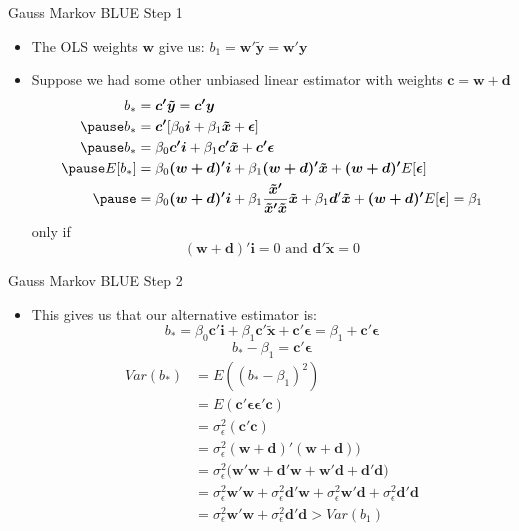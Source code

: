 \documentclass[aspectratio=169, handout]{beamer}
\numberwithin{equation}{section}
\begin{document}
\begin{frame}{Gauss Markov BLUE Step 1}
\begin{itemize}
\item The OLS weights $\bm{w}$ give us: $b_1=\bm{w'}\bm{\tilde{y}}=\bm{w'}\bm{y}$
\item Suppose we had some other unbiased linear estimator with weights $\bm{c}=\bm{w+d}$\pause
\begin{align*}
b_*&=\bm{c'}\bm{\tilde{y}}=\bm{c'}\bm{y}\\\pause
b_*&=\bm{c'}[\beta_0\bm{i}+\beta_1\bm{\tilde{x}}+\bm{\epsilon}]\\\pause
b_*&=\beta_0\bm{c'}\bm{i}+\beta_1\bm{c'}\bm{\tilde{x}}+\bm{c'\epsilon}\\\pause
E[b_*]&=\beta_0\bm{(w+d)'}\bm{i}+\beta_1\bm{(w+d)'}\bm{\tilde{x}}+\bm{(w+d)'}E[\bm{\epsilon}]\\\pause
&=\beta_0\bm{(w+d)'}\bm{i}+\beta_1\frac{\bm{\tilde{x}'}}{\bm{\tilde{x}'\tilde{x}}}\bm{\tilde{x}}+\beta_1\bm{d}'\bm{\tilde{x}}+\bm{(w+d)'}E[\bm{\epsilon}]=\beta_1
\end{align*}
only if 
$$\bm{(w+d)'}\bm{i}=0 \text{ and } \bm{d'}\bm{\tilde{x}}=0$$
\end{itemize}
\end{frame}

\begin{frame}{Gauss Markov BLUE Step 2}
\begin{itemize}
\item This gives us that our alternative estimator is:
$$b_*=\beta_0\bm{c'}\bm{i}+\beta_1\bm{c'}\bm{\tilde{x}}+\bm{c'\epsilon}=\beta_1+\bm{c'\epsilon}$$
$$b_*-\beta_1=\bm{c'\epsilon}$$
\begin{align*}
Var(b_*)&=E((b_*-\beta_1)^2)\\
&=E(\bm{c'\epsilon}\bm{\epsilon' c})\\
&=\sigma^2_\epsilon (\bm{c'c})\\
&=\sigma^2_\epsilon \bm{(w+d)'(w+d)})\\
&=\sigma^2_\epsilon \bm{(w'w+d'w+w'd+d'd})\\
&= \sigma^2_\epsilon \bm{w'w}+\sigma^2_\epsilon \bm{d'w}+\sigma^2_\epsilon \bm{w'd}+\sigma^2_\epsilon \bm{d'd}\\
&= \sigma^2_\epsilon \bm{w'w}+\sigma^2_\epsilon \bm{d'd}>Var(b_1)
\end{align*}
\end{itemize}
\end{frame}
\end{document}
